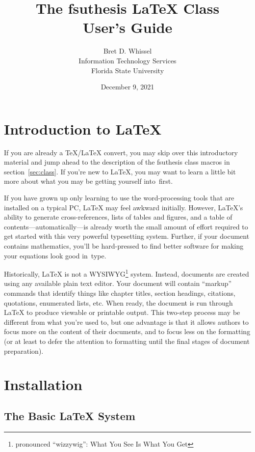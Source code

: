 \documentclass[11pt,letterpaper]{ltxdockit}[2011/03/25]
\title{The \textsf{fsuthesis} \LaTeX{} Class\\User's Guide}
\author{Bret D. Whissel\\Information Technology Services\\Florida State University}
\date{December 9, 2021}
\newcommand*{\acro}[1]{{\small\textsc{#1}}}
\newcommand*{\pkg}[1]{\textsf{#1}}
\newcommand*{\fsuth}{\pkg{fsuthesis}}
\renewcommand{\-}{\discretionary{}{}{}}
\begin{document}
\maketitle


\tableofcontents

\section{Introduction to \LaTeX}
\label{sec:intro}

If you are already a \TeX/\LaTeX{} convert, you may skip over this
introductory material and jump ahead to the description of the
\fsuth{} class macros in section~\ref{sec:class}.  If you're new to
\LaTeX, you may want to learn a little bit more about what you may be
getting yourself into~first.

If you have grown up only learning to use the word-processing tools
that are installed on a typical PC, \LaTeX{} may feel awkward
initially.  However, \LaTeX's ability to generate cross-references,
lists of tables and figures, and a table of
contents---automatically---is already worth the small amount of effort
required to get started with this very powerful typesetting system.
Further, if your document contains mathematics, you'll be hard-pressed
to find better software for making your equations look good in~type.

Historically, \LaTeX{} is not a \acro{WYSIWYG}\footnote{pronounced
  ``wizzywig'': What You See Is What You Get} system.
Instead, documents are created using any available plain text editor.
Your document will contain ``markup'' commands that identify things
like chapter titles, section headings, citations, quotations,
enumerated lists, etc.  When ready, the document is run through
\LaTeX{} to produce viewable or printable output.  This two-step
process may be different from what you're used to, but one advantage
is that it allows authors to focus more on the content of their
documents, and to focus less on the formatting (or at least to defer
the attention to formatting until the final stages of document
preparation).

\section{Installation}%
%
\label{sec:install}

\subsection{The Basic \LaTeX{} System}
\end{document}

